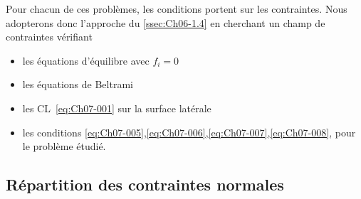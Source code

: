 Pour chacun de ces problèmes, les conditions portent sur les contraintes.
Nous adopterons donc l'approche du \ref{ssec:Ch06-1.4} en cherchant un champ de contraintes vérifiant
\begin{itemize}
    \item les équations d'équilibre avec $f_i=0$
    \item les équations de Beltrami
    \item les CL~\eqref{eq:Ch07-001} sur la surface latérale
    \item les conditions \eqref{eq:Ch07-005},\eqref{eq:Ch07-006},\eqref{eq:Ch07-007},\eqref{eq:Ch07-008}, pour le problème étudié.
\end{itemize}
\subsection{Répartition des contraintes normales}
\endinput
On constate tout d'abord sur \eqref{eq:Ch07-005}, \eqref{eq:Ch07-006}, \eqref{eq:Ch07-007}, \eqref{eq:Ch07-008}, que 'R, ' 'n1.~ et 'm~ ne font intervenir que la contrainte norrr~le (pour une facette de la section droite) <r" Nous cherchons donc le champ des contraintes sous la forme 
CT (~.. ~".'ltl) o 
\eqref{eq:Ch06-013} o
or" 0 
[ 
o o 

Les CL \eqref{eq:Ch07-001} sur 11). surface latérale sont alors automatique~ijt vé­
..
rifiées, pUlsque 'Y\. .. «(},-"".,""',) Les équations d'équilibre se rédttis~I)t à 

Les équations de Beltrami (VI.30) se réduisent alors à 

qui donne (3"",,, fonction linéaire de x2, x3. 

Il ne reste plus. à écrire que les conditions sur les extrémités, en reportant le tenseur des contraintes défini par \eqref{eq:Ch06-013} et \eqref{eq:Ch06-016} dans \eqref{eq:Ch07-005},\eqref{eq:Ch07-006},\eqref{eq:Ch07-007} et \eqref{eq:Ch07-008}, on obtient 
~
'R, Q, § d,s + .R,. § ~J, <is ... .c ~ f.(~ cls 
r-I: r. 
-'Ill = CL $f.(~ cis t ~ ~ I.e; ris t .(. § .oc~ "". Js
( 17) 
~ r r. 1­
'ml, = 0-S) f.(~ J.s + ~ %
1: L-E 
'RJ, '" 1<, = 0 'hl. = 0
 
Les intégrales qui interviennent dans \eqref{eq:Ch06-017} dépendent uniquement de la forme de la section. Ainsi, le système \eqref{eq:Ch06-017} donnera 0.., ),.., ,Co, en fonction de 1<., ~ et ~ . Nous pourrons donc résoudre par un champ de contraintes de la 
~ ~ 
forme \eqref{eq:Ch06-013},\eqref{eq:Ch06-016}, les problèmes 1, 5 et 6 -traction et flexion pure 
Pour déterminer complètement les contraintes, il reste à calculer 
Q, , .,g. et .G , càd résoudre le système \eqref{eq:Ch06-017}. Un choix judicieux du système d'axes xxdans le plan de la section droite ! va faciliter cette réso­
2 3 lution. Tout d'abord, on choisit l'origine au centre de gravité de L , ce 
qui assure 
( 18) 

